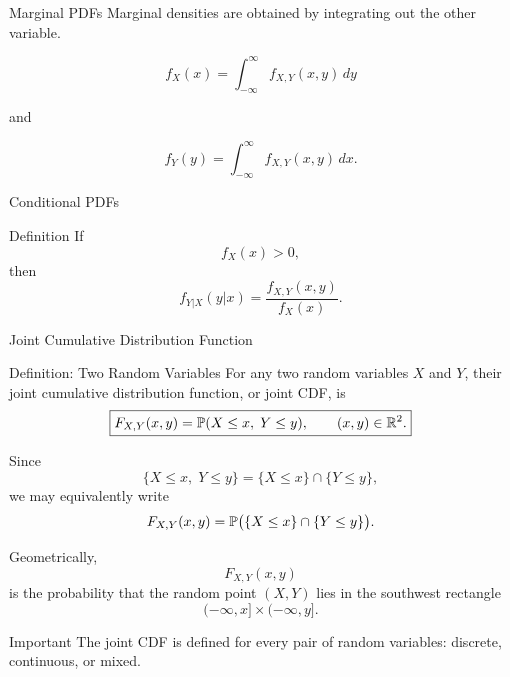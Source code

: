 \begin{frame}{Marginal PDFs}
Marginal densities are obtained by integrating out the other variable.

\vspace{0.25cm}

\[
{
f_X(x)
=
\int_{-\infty}^\infty
f_{X,Y}(x,y)\,dy
}
\]

and

\[
{
f_Y(y)
=
\int_{-\infty}^\infty
f_{X,Y}(x,y)\,dx.
}
\]
\end{frame}

\begin{frame}{Conditional PDFs}
\begin{keybox}{Definition}
If
\[
f_X(x)>0,
\]
then
\[
{
f_{Y|X}(y|x)
=
\frac{
f_{X,Y}(x,y)
}{
f_X(x)
}.
}
\]
\end{keybox}
\end{frame}


















\begin{frame}{Joint Cumulative Distribution Function}

\begin{keybox}{Definition: Two Random Variables}
For any two random variables \(X\) and \(Y\), their joint cumulative
distribution function, or joint CDF, is
\[
\boxed{
F_{X,Y}(x,y)
=
\mathbb{P}(X\le x,\;Y\le y),
\qquad (x,y)\in\mathbb{R}^2.
}
\]
\end{keybox}

Since
\[
\{X\le x,\;Y\le y\}
=
\{X\le x\}\cap\{Y\le y\},
\]
we may equivalently write
\[
F_{X,Y}(x,y)
=
\mathbb{P}\big(\{X\le x\}\cap\{Y\le y\}\big).
\]

\vspace{0.2cm}

Geometrically,
\[
F_{X,Y}(x,y)
\]
is the probability that the random point \((X,Y)\) lies in the
southwest rectangle
\[
(-\infty,x]\times(-\infty,y].
\]

\begin{keybox}{Important}
The joint CDF is defined for every pair of random variables:
discrete, continuous, or mixed.
\end{keybox}

\end{frame}








